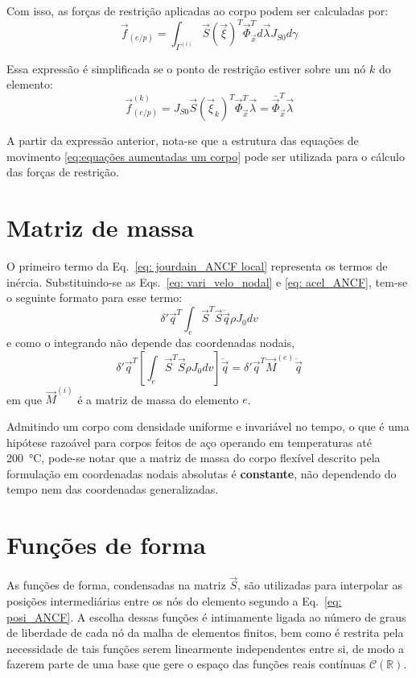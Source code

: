     Com isso, as forças de restrição aplicadas ao corpo podem ser calculadas por:
\begin{equation}
    \vec{f}_{(e/p)} = \int_{\Gamma^{(i)}}{\vec{S}(\vec{\xi})^T \vec{\Phi}_{\vec{x}}^T d\vec{\lambda} J_{S0} d\gamma}
\end{equation}

    Essa expressão é simplificada se o ponto de restrição estiver sobre um nó $k$ do elemento:
\begin{equation}
    \vec{f}_{(e/p)}^{(k)} = {J_{S0}\vec{S}(\vec{\xi}_k)^T \vec{\Phi}_{\vec{x}}^T\vec{\lambda}  } = \bar{\vec{\Phi}}_{\vec{x}}^T\vec{\lambda} 
\end{equation}

    A partir da expressão anterior, nota-se que a estrutura das equações de movimento \eqref{eq:equações aumentadas um corpo}
pode ser utilizada para o cálculo das forças de restrição.

\section{Matriz de massa}
O primeiro termo da Eq.~\eqref{eq: jourdain_ANCF local} representa os termos de inércia. 
Substituindo-se as Eqs.~\eqref{eq: vari_velo_nodal} e \eqref{eq: acel_ANCF}, tem-se o seguinte formato para esse termo:
\begin{equation}
    \delta'\vec{q}^T\int_{e}{\vec{S}^T \vec{S}\ddot{\vec{q}} \rho J_0 dv}
\end{equation}
e como o integrando não depende das coordenadas nodais,
\begin{equation}
    \delta'\vec{q}^T\left[\int_{e}{\vec{S}^T \vec{S} \rho J_0 dv}\right]\ddot{\vec{q}} = \delta'\vec{q}^T\vec{M}^{(e)}\ddot{\vec{q}}
\end{equation}
em que $\vec{M}^{(i)}$ é a matriz de massa do elemento $e$.

Admitindo um corpo com densidade uniforme e invariável no tempo, o que é uma hipótese razoável para corpos feitos
de aço operando em temperaturas até \SI{200}{\celsius}, pode-se notar que a matriz de massa do corpo flexível descrito
pela formulação em coordenadas nodais absolutas é \textbf{constante}, não dependendo do tempo nem das coordenadas
generalizadas.

\section{Funções de forma}
As funções de forma, condensadas na matriz $\vec{S}$, são utilizadas para interpolar as posições intermediárias entre os nós do elemento 
segundo a Eq.~\eqref{eq: posi_ANCF}. A escolha dessas funções é intimamente ligada ao número de graus de liberdade de cada nó 
da malha de elementos finitos, bem como é restrita pela necessidade de tais funções serem linearmente independentes entre si,
de modo a fazerem parte de uma base que gere o espaço das funções reais contínuas $\mathcal{C}(\mathbb{R})$.

